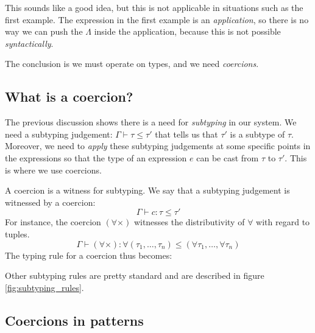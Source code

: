 \documentclass[10pt,a4paper,twoside,titlepage,twocolumn]{article}
\begin{document}
This sounds like a good idea, but this is not applicable in situations such as
the first example. The expression in the first example is an
\emph{application}, so there is no way we can push the $\Lambda$ inside the
application, because this is not possible \emph{syntactically}.

The conclusion is we must operate on types, and we need \emph{coercions}.

\subsection{What is a coercion?}

The previous discussion shows there is a need for \emph{subtyping} in our
system. We need a subtyping judgement: $\Gamma \vdash \tau \leq \tau'$ that tells us
that $\tau'$ is a subtype of $\tau$. Moreover, we need to \emph{apply} these subtyping
judgements at some specific points in the expressions so that the type of an
expression $e$ can be cast from $\tau$ to $\tau'$. This is where we use coercions.

A coercion is a witness for subtyping. We say that a subtyping judgement is
witnessed by a coercion:
$$\Gamma \vdash c: \tau \leq \tau'$$
For instance, the coercion $(\forall\times)$ witnesses the distributivity of
$\forall$ with regard to tuples.
$$\Gamma \vdash (\forall\times): \forall (\tau_1, \dots, \tau_n) \leq
(\forall\tau_1,\dots,\forall\tau_n)$$
The typing rule for a coercion thus becomes:
\begin{prooftree}
\end{prooftree}

Other subtyping rules are pretty standard and are described in figure \vref{fig:subtyping_rules}.

\subsection{Coercions in patterns}
\end{document}
